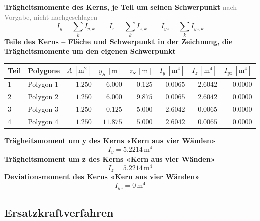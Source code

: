 \documentclass[11pt,a4paper]{article}
\newcommand{\normref}[1]{{\small\textcolor{gray}{#1}}}
\begin{document}
\noindent\textbf{Trägheitsmomente des Kerns, je Teil um seinen Schwerpunkt} \hfill \normref{nach Vorgabe, nicht nachgeschlagen}
\begin{equation*}
I_y = \sum_k I_{y,k} \qquad I_z = \sum_k I_{z,k} \qquad I_{yz} = \sum_k I_{yz,k}
\end{equation*}
\noindent\textbf{Teile des Kerns – Fläche und Schwerpunkt in der Zeichnung, die Trägheitsmomente um den eigenen Schwerpunkt}
\begin{longtable}{llrrrrrr}
\hline
Teil & Polygone & $A\ [\mathrm{m}^2]$ & $y_S\ [\mathrm{m}]$ & $z_S\ [\mathrm{m}]$ & $I_y\ [\mathrm{m}^4]$ & $I_z\ [\mathrm{m}^4]$ & $I_{yz}\ [\mathrm{m}^4]$ \\
\hline
\endhead
1 & Polygon 1 & $1.250$ & $6.000$ & $0.125$ & $0.0065$ & $2.6042$ & $0.0000$ \\
2 & Polygon 2 & $1.250$ & $6.000$ & $9.875$ & $0.0065$ & $2.6042$ & $0.0000$ \\
3 & Polygon 3 & $1.250$ & $0.125$ & $5.000$ & $2.6042$ & $0.0065$ & $0.0000$ \\
4 & Polygon 4 & $1.250$ & $11.875$ & $5.000$ & $2.6042$ & $0.0065$ & $0.0000$ \\
\hline
\end{longtable}
\noindent\textbf{Trägheitsmoment um y des Kerns «Kern aus vier Wänden»}
\begin{equation*}
I_y = 5.2214\,\mathrm{m}^{4}
\end{equation*}
\noindent\textbf{Trägheitsmoment um z des Kerns «Kern aus vier Wänden»}
\begin{equation*}
I_z = 5.2214\,\mathrm{m}^{4}
\end{equation*}
\noindent\textbf{Deviationsmoment des Kerns «Kern aus vier Wänden»}
\begin{equation*}
I_{yz} = 0\,\mathrm{m}^{4}
\end{equation*}
\subsection{Ersatzkraftverfahren}
\end{document}

